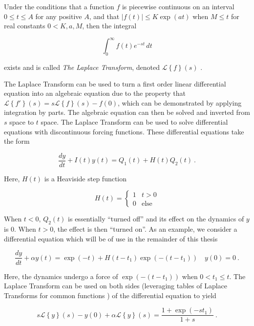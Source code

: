 Under the conditions that a function $f$ is piecewise continuous on an interval $0 \leq t \leq A$ for any positive $A$, and that $\vert f(t) \vert \leq K \exp(at)$ when $M \leq t$ for real constants $0< K, a, M $, then the integral

$$ \int_0^\infty f(t) e^{-st} \, dt  $$ 

\noindent exists and is called \textit{The Laplace Transform}, denoted $\mathcal{L}\left\{f\right\}(s)$ \cite[p.~317]{boyce2021elementary}.  


\noindent The Laplace Transform can be used to turn a first order linear differential equation into an algebraic equation due to the property that  $\mathcal{L}\left\{f'\right\}(s) = s\mathcal{L}\left\{f\right\}(s) - f(0) $, which can be demonstrated by applying integration by parts. The algebraic equation can then be solved and inverted from $s$ space to $t$ space.  The Laplace Transform can be used to solve differential equations with discontinuous forcing functions.  These differential equations take the form 

\begin{equation}
	\dfrac{dy}{dt} + I(t)y(t) = Q_1(t) + H(t)Q_2(t) \>.
\end{equation}

\noindent Here, $H(t)$ is a Heaviside step function

\begin{equation}
	H(t) = \begin{cases}  1 & t>0 \\ 0 & \mbox{else} \end{cases}
\end{equation}

\noindent  When $t<0$,  $Q_2(t)$ is essentially ``turned off'' and its effect on the dynamics of $y$ is 0.  When $t>0$, the effect is then ``turned on''. As an example, we consider a differential equation which will be of use in the remainder of this thesis

\begin{equation}
	\dfrac{dy}{dt} + \alpha y(t) = \exp(-t)  + H(t - t_1) \exp(-(t - t_1)) \quad y(0) = 0 \>.
\end{equation}

\noindent Here, the dynamics undergo a force of $\exp(-(t-t_1))$ when $0<t_1 \leq t$.  The Laplace Transform can be used on both sides (leveraging tables of Laplace Transforms for common functions \cite{boyce2021elementary}) of the differential equation to yield

$$ s\mathcal{L}\left\{y\right\}(s) - y(0) + \alpha \mathcal{L}\left\{y\right\}(s) = \dfrac{1 + \exp(-st_1)}{1+s} \>.  $$

